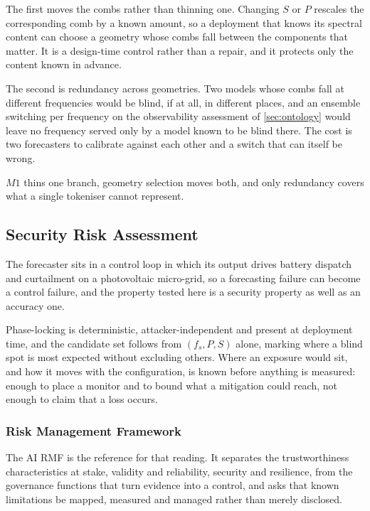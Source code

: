 The first moves the combs rather than thinning one. Changing $S$ or $P$ rescales the corresponding comb by a known amount, so a deployment that knows its spectral content can choose a geometry whose combs fall between the components that matter. It is a design-time control rather than a repair, and it protects only the content known in advance.

The second is redundancy across geometries. Two models whose combs fall at different frequencies would be blind, if at all, in different places, and an ensemble switching per frequency on the observability assessment of \autoref{sec:ontology} would leave no frequency served only by a model known to be blind there. The cost is two forecasters to calibrate against each other and a switch that can itself be wrong.

$M1$ thins one branch, geometry selection moves both, and only redundancy covers what a single tokeniser cannot represent.
\endgroup

\subsection{Security Risk Assessment}\label{sec:securityAssessment}
\begingroup
\let\subsection\subsubsection
The forecaster sits in a control loop in which its output drives battery dispatch and curtailment on a photovoltaic micro-grid, so a forecasting failure can become a control failure, and the property tested here is a security property as well as an accuracy one.

Phase-locking is deterministic, attacker-independent and present at deployment time, and the candidate set follows from $(f_s,P,S)$ alone, marking where a blind spot is most expected without excluding others. Where an exposure would sit, and how it moves with the configuration, is known before anything is measured: enough to place a monitor and to bound what a mitigation could reach, not enough to claim that a loss occurs.

\subsection{Risk Management Framework}
The AI RMF\autocite{tabassiArtificialIntelligenceRisk2023} is the reference for that reading. It separates the trustworthiness characteristics at stake, validity and reliability, security and resilience, from the governance functions that turn evidence into a control, and asks that known limitations be mapped, measured and managed rather than merely disclosed.

